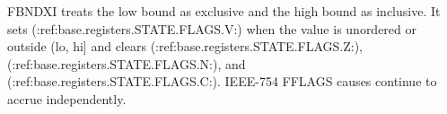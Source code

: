 FBNDXI treats the low bound as exclusive and the high bound as inclusive. It sets (:ref:base.registers.STATE.FLAGS.V:) when the value is unordered or outside (lo, hi] and clears (:ref:base.registers.STATE.FLAGS.Z:), (:ref:base.registers.STATE.FLAGS.N:), and (:ref:base.registers.STATE.FLAGS.C:). IEEE-754 FFLAGS causes continue to accrue independently.
